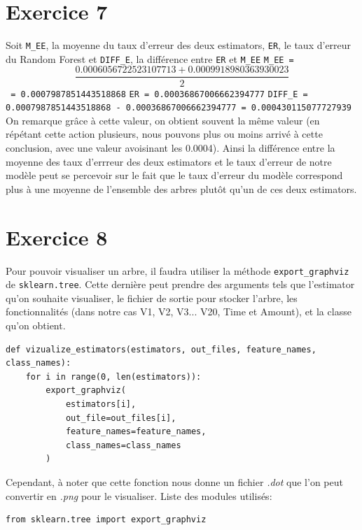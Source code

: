 \documentclass[a4paper, 12pt, oneside]{book}
\begin{document}
\section{Exercice 7}
Soit \texttt{M\_EE}, la moyenne du taux d'erreur des deux estimators, \texttt{ER}, le taux d'erreur du Random Forest et \texttt{DIFF\_E}, la différence entre \texttt{ER} et \texttt{M\_EE}
\newline
\texttt{M\_EE = \begin{equation} \frac{0.0006056722523107713 + 0.0009918980363930023}{2} \end{equation} = 0.0007987851443518868}
\newline
\texttt{ER = 0.00036867006662394777}
\newline
\texttt{DIFF\_E = 0.0007987851443518868 - 0.00036867006662394777 = 0.000430115077727939}
\newline \newline
On remarque grâce à cette valeur, on obtient souvent la même valeur (en répétant cette action plusieurs, nous pouvons plus ou moins arrivé à cette conclusion, avec une valeur avoisinant les 0.0004). Ainsi la différence entre la moyenne des taux d'errreur des deux estimators et le taux d'erreur de notre modèle peut se percevoir sur le fait que le taux d'erreur du modèle correspond plus à une moyenne de l'ensemble des arbres plutôt qu'un de ces deux estimators.

 

\section{Exercice 8}
Pour pouvoir visualiser un arbre, il faudra utiliser la méthode \texttt{export\_graphviz} de \texttt{sklearn.tree}. Cette dernière peut prendre des arguments tels que l'estimator qu'on souhaite visualiser, le fichier de sortie pour stocker l'arbre, les fonctionnalités (dans notre cas V1, V2, V3... V20, Time et Amount), et la classe qu'on obtient.
\begin{verbatim}
def vizualize_estimators(estimators, out_files, feature_names, class_names):
    for i in range(0, len(estimators)):
        export_graphviz(
            estimators[i],
            out_file=out_files[i],
            feature_names=feature_names,
            class_names=class_names
        )
\end{verbatim}
Cependant, à noter que cette fonction nous donne un fichier \textit{.dot} que l'on peut convertir en \textit{.png} pour le visualiser.
\newline \newline
Liste des modules utilisés:
\begin{verbatim}
from sklearn.tree import export_graphviz
\end{verbatim}
\end{document}
